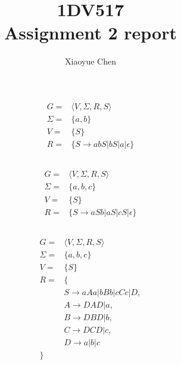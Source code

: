 \documentclass{article}
\author{Xiaoyue Chen}
\title{1DV517\\Assignment 2 report}
\begin{document}
\maketitle

\section{}
\subsection{}
\begin{align*}
	G =      & \langle V, \Sigma, R, S \rangle             \\
	\Sigma = & \{ a, b \}                                  \\
	V =      & \{ S \}                                     \\
	R =      & \{ S \rightarrow abS | bS | a | \epsilon \}
\end{align*}

\subsection{}
\begin{align*}
	G =      & \langle V, \Sigma, R, S \rangle              \\
	\Sigma = & \{ a, b, c \}                                \\
	V =      & \{ S \}                                      \\
	R =      & \{ S \rightarrow aSb | aS | cS | \epsilon \}
\end{align*}

\subsection{}
\begin{align*}
	G =      & \langle V, \Sigma, R, S \rangle    \\
	\Sigma = & \{ a, b, c \}                      \\
	V =      & \{ S \}                            \\
	R =      & \{                                 \\
	         & S \rightarrow aAa | bBb | cCc | D, \\
	         & A \rightarrow DAD | a,             \\
	         & B \rightarrow DBD | b,             \\
	         & C \rightarrow DCD | c,             \\
	         & D \rightarrow a | b | c            \\
	\}
\end{align*}
\end{document}
